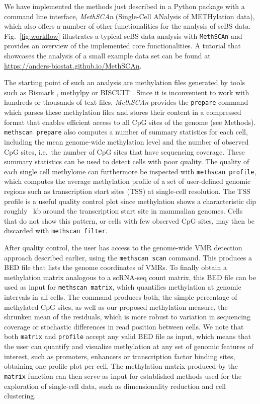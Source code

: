 \documentclass[10pt]{article}
\begin{document}
We have implemented the methods just described in a Python package with a command line interface, \textit{MethSCAn} (Single-Cell ANalysis of METHylation data), which also offers a number of other functionalities for the analysis of scBS data. 
Fig.~\ref{fig:workflow} illustrates a typical scBS data analysis with \texttt{MethSCAn} and provides an overview of the implemented core functionalities.
A tutorial that showcases the analysis of a small example data set can be found at \url{https://anders-biostat.github.io/MethSCAn}.

The starting point of such an analysis are methylation files generated by tools such as Bismark \citep{bismark}, methylpy \citep{methylpy} or BISCUIT \citep{biscuit}.
Since it is inconvenient to work with hundreds or thousands of text files, \textit{MethSCAn} provides the \texttt{prepare} command which parses these methylation files and stores their content in a compressed format that enables efficient access to all CpG sites of the genome (see Methods).
\texttt{methscan prepare} also computes a number of summary statistics for each cell, including the mean genome-wide methylation level and the number of observed CpG sites, i.e.\ the number of CpG sites that have sequencing coverage.
These summary statistics can be used to detect cells with poor quality.
The quality of each single cell methylome can furthermore be inspected with \texttt{methscan profile}, which computes the average methylation profile of a set of user-defined genomic regions such as transcription start sites (TSS) at single-cell resolution.
The TSS profile is a useful quality control plot since methylation shows a characteristic dip roughly ~kb around the transcription start site in mammalian genomes.
Cells that do not show this pattern, or cells with few observed CpG sites, may then be discarded with \texttt{methscan filter}.

After quality control, the user has access to the genome-wide VMR detection approach described earlier, using the \texttt{methscan scan} command.
This produces a BED file that lists the genome coordinates of VMRs.
To finally obtain a methylation matrix analogous to a scRNA-seq count matrix, this BED file can be used as input for \texttt{methscan matrix}, which quantifies methylation at genomic intervals in all cells.
The command produces both, the simple percentage of methylated CpG sites, as well as our proposed methylation measure, the shrunken mean of the residuals, which is more robust to variation in sequencing coverage or stochastic differences in read position between cells.
We note that both \texttt{matrix} and \texttt{profile} accept any valid BED file as input, which means that the user can quantify and visualize methylation at any set of genomic features of interest, such as promoters, enhancers or transcription factor binding sites, obtaining one profile plot per cell.
The methylation matrix produced by the \texttt{matrix} function can then serve as input for established methods used for the exploration of single-cell data, such as dimensionality reduction and cell clustering.
\end{document}

